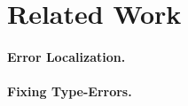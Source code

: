 \section{Related Work}
\label{sec:related-work}

\paragraph{Error Localization.}

\paragraph{Fixing Type-Errors.}
